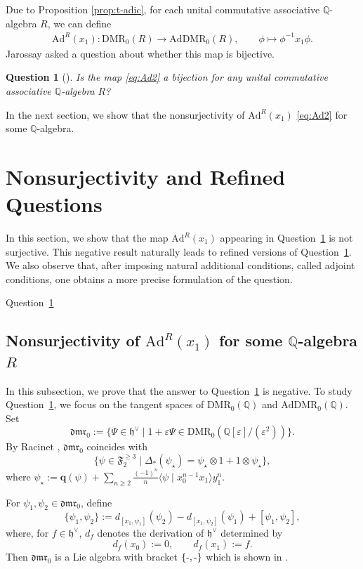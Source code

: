 \documentclass[15pt,oneside,reqno]{amsart}
\newtheorem{qu}[df]{Question}
\theoremstyle{remark}{
\newtheorem{lem}[df]{Lemma}
\newtheorem{prop}[df]{Proposition}
\newtheorem{ex}[df]{Example}
\newtheorem{rmk}[df]{Remark}
}
\newcommand{\ide}[1]{\mathfrak{#1}}
\newcommand{\Q}{\mathbb{Q}}
\newcommand{\DMR}{\mathrm{DMR}}
\newcommand{\dmr}{\mathfrak{dmr}}
\newcommand{\AdDMR}{\mathrm{AdDMR}}
\newcommand{\Ad}{\mathrm{Ad}}
\begin{document}
Due to Proposition \ref{prop:t-adic}, for each unital commutative associative $\Q$-algebra $R$, we can define
\begin{align}
\Ad^R(x_1)\colon \DMR_0(R) \longrightarrow \AdDMR_0(R), \qquad \phi \longmapsto \phi^{-1} x_1 \phi. \label{eq:Ad2}
\end{align}
Jarossay asked a question about whether this map is bijective.
\begin{qu}[{\cite[Question 3.2.8]{Jarossay}}]\label{qu:Jarossay}
Is the map \eqref{eq:Ad2} a bijection for any unital commutative associative $\Q$-algebra $R$?
\end{qu}

In the next section, we show that the nonsurjectivity of $\Ad^R(x_1)$ \eqref{eq:Ad2} for some $\Q$-algebra.

\section{Nonsurjectivity and Refined Questions}

In this section, we show that the map $\Ad^R(x_1)$ appearing in Question~\ref{qu:Jarossay} is not surjective.
This negative result naturally leads to refined versions of Question~\ref{qu:Jarossay}.
We also observe that, after imposing natural additional conditions, called adjoint conditions, one obtains a more precise formulation of the question.

Question~\ref{qu:Jarossay}

\subsection{Nonsurjectivity of $\Ad^R(x_1)$ for some $\Q$-algebra $R$}

In this subsection, we prove that the answer to Question~\ref{qu:Jarossay} is negative.
To study Question~\ref{qu:Jarossay}, we focus on the tangent spaces of $\DMR_0(\Q)$ and $\AdDMR_0(\Q)$.
Set
\[
\dmr_0 := \{\Psi \in \ide{h}^{\vee} \mid 1 + \varepsilon \Psi \in \DMR_0(\Q[\varepsilon]/(\varepsilon^2))\}.
\]
By Racinet \cite[Section 3.3.1, 3.3.8]{Racinet}, $\dmr_0$ coincides with
\[
\{\psi \in \ide{F}_2^{\ge 3} \mid \Delta_*(\psi_{\star}) = \psi_{\star} \otimes 1 + 1\otimes \psi_{\star} \},
\]
where $\psi_{\star} := \mathbf{q}(\psi) + \sum_{n\ge 2} \frac{(-1)^n}{n} \langle \psi \mid x_0^{n-1} x_1\rangle y_1^n$.

\begin{rmk}
For $\psi_1,\psi_2 \in \dmr_0$, define
\[
\{\psi_1,\psi_2\}
:= d_{[x_1,\psi_1]}(\psi_2)-d_{[x_1,\psi_2]}(\psi_1)+[\psi_1,\psi_2],
\]
where, for $f\in \ide{h}^{\vee}$, $d_f$ denotes the derivation of $\ide{h}^{\vee}$ determined by
\[
d_f(x_0) :=0,\qquad d_f(x_1) :=f.
\]
Then $\dmr_0$ is a Lie algebra with bracket $\{\mathchar`-,\mathchar`-\}$ which is shown in \cite[Proposition 4.A.1]{Racinet}.
\end{rmk}
\end{document}
